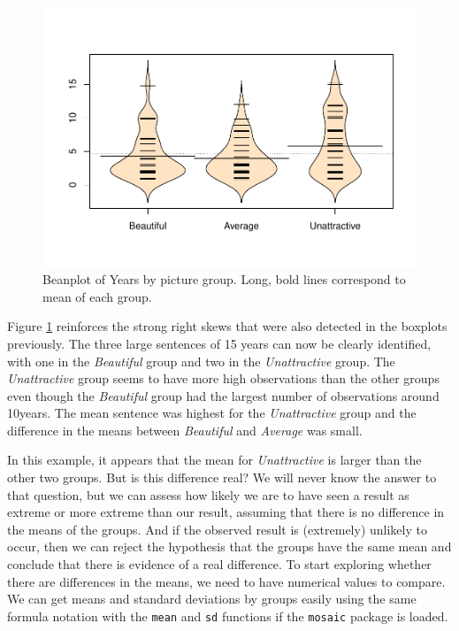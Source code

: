 \documentclass[]{book}
\begin{document}
\begin{figure}
\centering
\includegraphics{GreenwoodBanner_files/figure-latex/Figure2-5-1.pdf}
\caption{\label{fig:Figure2-5}Beanplot of Years by picture group. Long, bold lines
correspond to mean of each group.}
\end{figure}

Figure \ref{fig:Figure2-5} reinforces the strong right skews that were
also detected in the boxplots previously. The three large sentences of
15 years can now be clearly identified, with one in the \emph{Beautiful}
group and two in the \emph{Unattractive} group. The \emph{Unattractive}
group seems to have more high observations than the other groups even
though the \emph{Beautiful} group had the largest number of observations
around 10years. The mean sentence was highest for the
\emph{Unattractive} group and the difference in the means between
\emph{Beautiful} and \emph{Average} was small.

In this example, it appears that the mean for \emph{Unattractive} is
larger than the other two groups. But is this difference real? We will
never know the answer to that question, but we can assess how likely we
are to have seen a result as extreme or more extreme than our result,
assuming that there is no difference in the means of the groups. And if
the observed result is (extremely) unlikely to occur, then we can reject
the hypothesis that the groups have the same mean and conclude that
there is evidence of a real difference. To start exploring whether there
are differences in the means, we need to have numerical values to
compare. We can get means and standard deviations by groups easily using
the same formula notation with the \texttt{mean} and \texttt{sd}
functions if the \texttt{mosaic} package is loaded.
\end{document}
